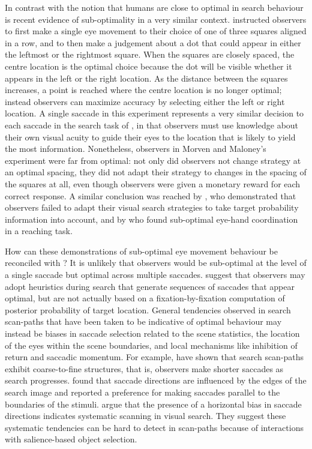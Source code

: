 \documentclass[preprint, authoryear]{elsarticle} %
\begin{document}
In contrast with the notion that humans are close to optimal in search behaviour is recent evidence of sub-optimality in a very similar context. \cite{morvan2012} instructed observers to first make a single eye movement to their choice of one of three squares aligned in a row, and to then make a judgement about a dot that could appear in either the leftmost or the rightmost square. When the squares are closely spaced, the centre location is the optimal choice because the dot will be visible whether it appears in the left or the right location. As the distance between the squares increases, a point is reached where the centre location is no longer optimal; instead observers can maximize accuracy by selecting either the left or right location. A single saccade in this experiment represents a very similar decision to each saccade in the search task of  \cite{najemnik-geisler2005}, in that observers must use knowledge about their own visual acuity to guide their eyes to the location that is likely to yield the most information. Nonetheless, observers in Morven and Maloney's experiment were far from optimal: not only did observers not change strategy at an optimal spacing, they did not adapt their strategy to changes in the spacing of the squares at all, even though observers were given a monetary reward for each correct response. A similar conclusion was reached by \cite{verghese2012}, who demonstrated that observers failed to adapt their visual search strategies to take target probability information into account, and by \cite{zhang2012} who found sub-optimal eye-hand coordination in a reaching task.
\par
How can these demonstrations of sub-optimal eye movement behaviour be reconciled with \cite{najemnik-geisler2005,najemnik-geisler2008}? It is unlikely that observers would be sub-optimal at the level of a single saccade but optimal across multiple saccades. \cite{morvan2012} suggest that observers may adopt heuristics during search that generate sequences of saccades that appear optimal, but are not actually based on a fixation-by-fixation computation of posterior probability of target location. General tendencies observed in search scan-paths that have been taken to be indicative of optimal behaviour may instead be biases in saccade selection related to the scene statistics, the location of the eyes within the scene boundaries, and local mechanisms like inhibition of return and saccadic momentum. For example, \cite{over2007} have shown that search scan-paths exhibit coarse-to-fine structures, that is, observers make shorter saccades as search progresses. \cite{over2003} found that saccade directions are influenced by the edges of the search image and reported a preference for making saccades parallel to the boundaries of the stimuli.  \cite{gilchrist-harvey2006} argue that the presence of a horizontal bias in saccade directions indicates systematic scanning in visual search. They suggest these systematic tendencies can be hard to detect in scan-paths because of interactions with salience-based object selection. 
\end{document}
